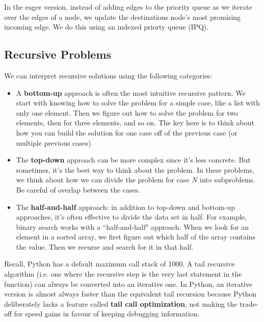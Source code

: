 \documentclass{article}
\begin{document}
    In the eager version, instead of adding edges to the priority queue as we iterate over the edges of a node, we update the destinations node's most promising incoming edge. We do this using an indexed priorty queue (IPQ).
    
    
    
    
    \subsection{Recursive Problems}
    We can interpret recursive solutions using the following categories:
    \begin{itemize}
        \item A \textbf{bottom-up} approach is often the most intuitive recursive pattern. We start with knowing how to solve the problem for a simple case, like a list with only one element. Then we figure out how to solve the problem for two elements, then for three elements, and so on. The key here is to think about how you can build the solution for one case off of the previous case (or multiple previous cases).
        
        \item The \textbf{top-down} approach can be more complex since it's less concrete. But sometimes, it's the best way to think about the problem. In these problems, we think about how we can divide the problem for case $N$ into subproblems. Be careful of overlap between the cases. 
        
        \item The \textbf{half-and-half} approach: in addition to top-down and bottom-up approaches, it's often effective to divide the data set in half. For example, binary search works with a ``half-and-half" approach. When we look for an element in a sorted array, we first figure out which half of the array contains the value. Then we recurse and search for it in that half.
    \end{itemize}
    
    Recall, Python has a default maximum call stack of 1000. A tail recursive algorithm (i.e. one where the recursive step is the very last statement in the function) can always be converted into an iterative one. In Python, an iterative version is almost always faster than the equivalent tail recursion because Python deliberately lacks a feature called \textbf{tail call optimization}, not making the trade-off for speed gains in favour of keeping debugging information.
    
\end{document}
